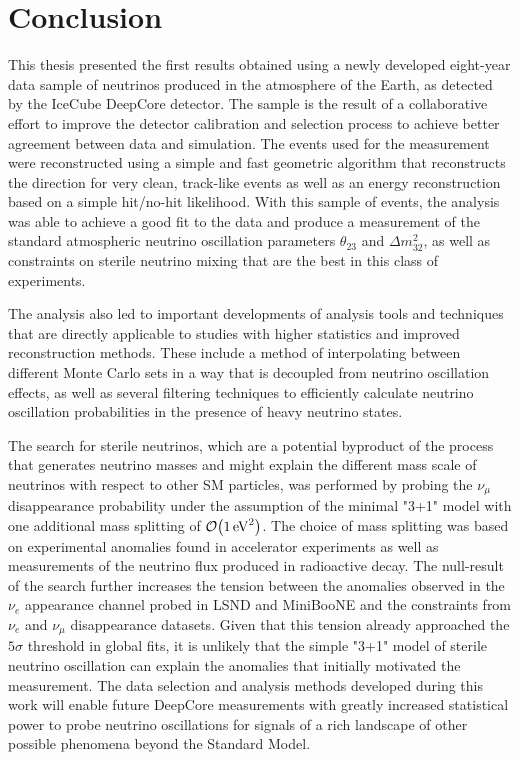 \chapter{Conclusion}

This thesis presented the first results obtained using a newly developed eight-year data sample of neutrinos produced in the atmosphere of the Earth, as detected by the IceCube DeepCore detector.
The sample is the result of a collaborative effort to improve the detector calibration and selection process to achieve better agreement between data and simulation.
The events used for the measurement were reconstructed using a simple and fast geometric algorithm that reconstructs the direction for very clean, track-like events as well as an energy reconstruction based on a simple hit/no-hit likelihood.
With this sample of events, the analysis was able to achieve a good fit to the data and produce a measurement of the standard atmospheric neutrino oscillation parameters $\theta_{23}$ and $\Delta m^2_{32}$, as well as constraints on sterile neutrino mixing that are the best in this class of experiments.

The analysis also led to important developments of analysis tools and techniques that are directly applicable to studies with higher statistics and improved reconstruction methods.
These include a method of interpolating between different Monte Carlo sets in a way that is decoupled from neutrino oscillation effects, as well as several filtering techniques to efficiently calculate neutrino oscillation probabilities in the presence of heavy neutrino states.

The search for sterile neutrinos, which are a potential byproduct of the process that generates neutrino masses and might explain the different mass scale of neutrinos with respect to other SM particles, was performed by probing the $\nu_\mu$ disappearance probability under the assumption of the minimal "3+1" model with one additional mass splitting of $\order{\SI{1}{\electronvolt\squared}}$.
The choice of mass splitting was based on experimental anomalies found in accelerator experiments as well as measurements of the neutrino flux produced in radioactive decay.
The null-result of the search further increases the tension between the anomalies observed in the $\nu_e$ appearance channel probed in LSND and MiniBooNE and the constraints from $\nu_e$ and $\nu_\mu$ disappearance datasets.
Given that this tension already approached the $5\sigma$ threshold in global fits, it is unlikely that the simple "3+1" model of sterile neutrino oscillation can explain the anomalies that initially motivated the measurement.
The data selection and analysis methods developed during this work will enable future DeepCore measurements with greatly increased statistical power to probe neutrino oscillations for signals of a rich landscape of other possible phenomena beyond the Standard Model.
